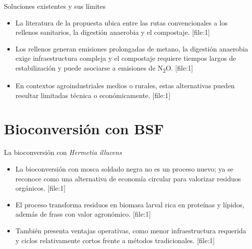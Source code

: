 \documentclass[10pt,aspectratio=169]{beamer}
\newcommand{\basecite}{\hfill{\color{griscita}\tiny [file:1]}}
\begin{document}
\begin{frame}{Soluciones existentes y sus límites}
\justifying
\begin{itemize}
    \item La literatura de la propuesta ubica entre las rutas convencionales a los rellenos sanitarios, la digestión anaerobia y el compostaje. \basecite
    \item Los rellenos generan emisiones prolongadas de metano, la digestión anaerobia exige infraestructura compleja y el compostaje requiere tiempos largos de estabilización y puede asociarse a emisiones de N\textsubscript{2}O. \basecite
    \item En contextos agroindustriales medios o rurales, estas alternativas pueden resultar limitadas técnica o económicamente. \basecite
\end{itemize}
\end{frame}

\section{Bioconversión con BSF}

\begin{frame}{La bioconversión con \textit{Hermetia illucens}}
\justifying
\begin{itemize}
    \item La bioconversión con mosca soldado negra no es un proceso nuevo; ya se reconoce como una alternativa de economía circular para valorizar residuos orgánicos. \basecite
    \item El proceso transforma residuos en biomasa larval rica en proteínas y lípidos, además de frass con valor agronómico. \basecite
    \item También presenta ventajas operativas, como menor infraestructura requerida y ciclos relativamente cortos frente a métodos tradicionales. \basecite
\end{itemize}
\end{frame}
\end{document}
